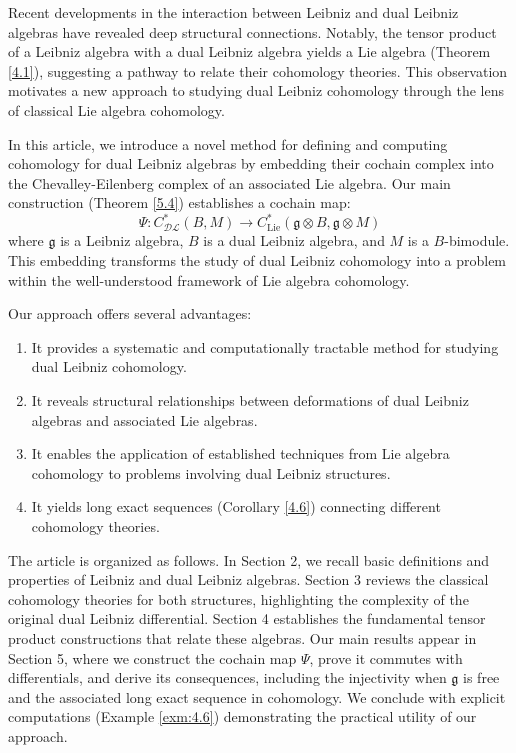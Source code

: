 \documentclass[a4paper, 12pt,oneside,reqno]{amsart}
\newcommand{\DL}{\mathcal{DL}}
\begin{document}
Recent developments in the interaction between Leibniz and dual Leibniz algebras \cite{GubarevKolesnikov} have revealed deep structural connections. Notably, the tensor product of a Leibniz algebra with a dual Leibniz algebra yields a Lie algebra (Theorem \ref{4.1}), suggesting a pathway to relate their cohomology theories. This observation motivates a new approach to studying dual Leibniz cohomology through the lens of classical Lie algebra cohomology.

In this article, we introduce a novel method for defining and computing cohomology for dual Leibniz algebras by embedding their cochain complex into the Chevalley-Eilenberg complex of an associated Lie algebra. Our main construction (Theorem \ref{5.4}) establishes a cochain map:
\[
\Psi : C^*_{\DL}(B, M) \rightarrow C^*_{\mathrm{Lie}}(\mathfrak{g} \otimes B, \mathfrak{g} \otimes M)
\]
where $\mathfrak{g}$ is a Leibniz algebra, $B$ is a dual Leibniz algebra, and $M$ is a $B$-bimodule. This embedding transforms the study of dual Leibniz cohomology into a problem within the well-understood framework of Lie algebra cohomology.

Our approach offers several advantages:
\begin{enumerate}[label=(\roman*)]
\item It provides a systematic and computationally tractable method for studying dual Leibniz cohomology.
\item It reveals structural relationships between deformations of dual Leibniz algebras and associated Lie algebras.
\item It enables the application of established techniques from Lie algebra cohomology to problems involving dual Leibniz structures.
\item It yields long exact sequences (Corollary \ref{4.6}) connecting different cohomology theories.
\end{enumerate}

The article is organized as follows. In Section 2, we recall basic definitions and properties of Leibniz and dual Leibniz algebras. Section 3 reviews the classical cohomology theories for both structures, highlighting the complexity of the original dual Leibniz differential. Section 4 establishes the fundamental tensor product constructions that relate these algebras. Our main results appear in Section 5, where we construct the cochain map $\Psi$, prove it commutes with differentials, and derive its consequences, including the injectivity when $\mathfrak{g}$ is free and the associated long exact sequence in cohomology. We conclude with explicit computations (Example \ref{exm:4.6}) demonstrating the practical utility of our approach.
\end{document}
